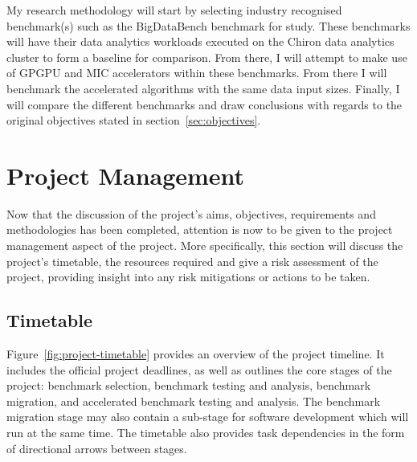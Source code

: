\documentclass[12pt,a4paper]{article}
\begin{document}
	My research methodology will start by selecting industry recognised benchmark(s) such as the BigDataBench benchmark for study. These benchmarks will have their data analytics workloads executed on the Chiron data analytics cluster to form a baseline for comparison. From there, I will attempt to make use of GPGPU and MIC accelerators within these benchmarks. From there I will benchmark the accelerated algorithms with the same data input sizes. Finally, I will compare the different benchmarks and draw conclusions with regards to the original objectives stated in section~\ref{sec:objectives}.
	

	\section{Project Management} %
	\label{sec:project_management}

		Now that the discussion of the project’s aims, objectives, requirements and methodologies has been completed, attention is now to be given to the project management aspect of the project. More specifically, this section will discuss the project’s timetable, the resources required and give a risk assessment of the project, providing insight into any risk mitigations or actions to be taken.

		\subsection{Timetable} %
		\label{sub:timetable}
		
			Figure~\ref{fig:project-timetable} provides an overview of the project timeline. It includes the official project deadlines, as well as outlines the core stages of the project: benchmark selection, benchmark testing and analysis, benchmark migration, and accelerated benchmark testing and analysis. The benchmark migration stage may also contain a sub-stage for software development which will run at the same time. The timetable also provides task dependencies in the form of directional arrows between stages.
\end{document}
